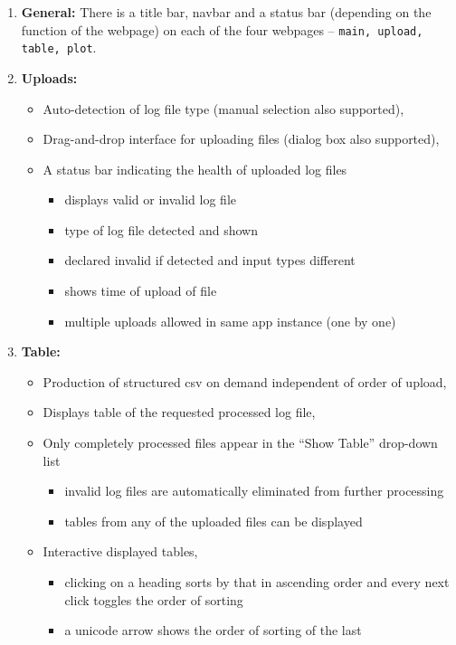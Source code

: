 \documentclass[11pt]{scrartcl}
\begin{document}
\begin{enumerate}
  \item \textbf{General:} There is a title bar, navbar and a status bar
    (depending on the function of the webpage) on each of the four webpages --
    \texttt{main, upload, table, plot}.
  \item \textbf{Uploads:} 
  \begin{itemize}
  \item Auto-detection of log file type (manual selection also supported), 
  \item Drag-and-drop interface for uploading files (dialog box also supported),
  \item A status bar indicating the health of uploaded log files
    \begin{itemize}
    \item displays valid or invalid log file
    \item type of log file detected and shown
    \item declared invalid if detected and input types different
    \item shows time of upload of file
    \item multiple uploads allowed in same app instance (one by one)
    \end{itemize}
  \end{itemize}
  \item \textbf{Table:} 
  \begin{itemize}
    \item Production of structured csv on demand independent of
    order of upload, 
    \item Displays table of the requested processed log file,
    \item Only completely processed files appear in the ``Show
      Table'' drop-down list
      \begin{itemize}
        \item invalid log files are automatically eliminated from further
          processing
        \item tables from any of the uploaded files can be displayed
      \end{itemize}
    \item Interactive displayed tables,
    \begin{itemize}
      \item clicking on a heading sorts by that in ascending order and every
        next click toggles the order of sorting
      \item a unicode arrow shows the order of sorting of the last

\end{itemize}
\end{itemize}
\end{enumerate}
\end{document}
